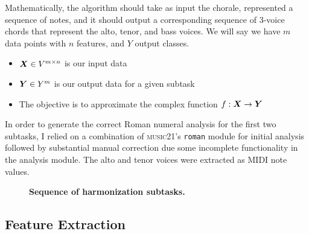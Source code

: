 \documentclass[11pt]{article}
\begin{document}
Mathematically, the algorithm should take as input the chorale, represented a sequence of notes, and it should output a corresponding sequence of 3-voice chords that represent the alto, tenor, and bass voices. We will say we have $m$ data points with $n$ features, and $Y$ output classes.
\begin{itemize}
\item $\boldsymbol{X} \in V^{m \times n}$ is our input data
\item $\boldsymbol{Y} \in Y^m$ is our output data for a given subtask
\item The objective is to approximate the complex function $f: \boldsymbol{X} \to \boldsymbol{Y}$
\end{itemize}

In order to generate the correct Roman numeral analysis for the first two subtasks, I relied on a combination of \textsc{music21}'s \texttt{roman} module for initial analysis followed by substantial manual correction due some incomplete functionality in the analysis module. The alto and tenor voices were extracted as MIDI note values. \\

\begin{figure}[h]
\begin{center}
\caption{\textbf{Sequence of harmonization subtasks.}}
\end{center}
\end{figure}


\subsection{Feature Extraction}
\end{document}

